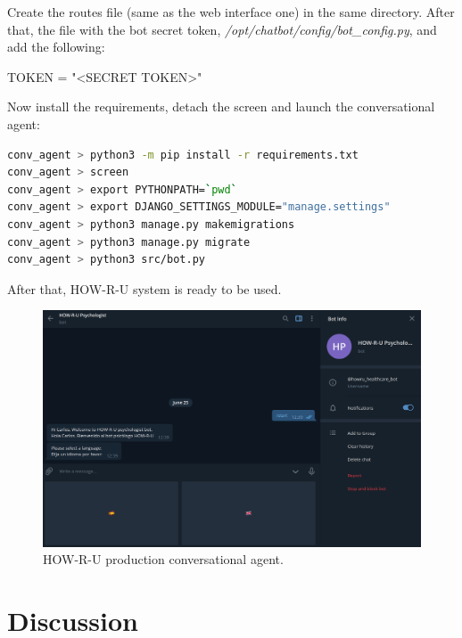 \documentclass[12pt,english]{article}
\begin{document}
Create the routes file (same as the web interface one) in the same directory. After that, the file with the bot secret token, \emph{/opt/chatbot/config/bot\_config.py}, and add the following:
\begin{python}[caption={bot\_config.py file contents}, captionpos=b]
TOKEN = "<SECRET TOKEN>"
\end{python}

Now install the requirements, detach the screen and launch the conversational agent:

\begin{lstlisting}[mathescape=false, language=bash, caption={Commands to detatch the screen, install the chatbot requirements and run it}, captionpos=b]
conv_agent > python3 -m pip install -r requirements.txt
conv_agent > screen
conv_agent > export PYTHONPATH=`pwd`
conv_agent > export DJANGO_SETTINGS_MODULE="manage.settings"
conv_agent > python3 manage.py makemigrations
conv_agent > python3 manage.py migrate
conv_agent > python3 src/bot.py
\end{lstlisting}

After that, HOW-R-U system is ready to be used.

\begin{figure}[H]
  \centering
    \includegraphics[width=\textwidth]{production.png}
    \caption{HOW-R-U production conversational agent.}
\end{figure}


\section{Discussion}
\end{document}
